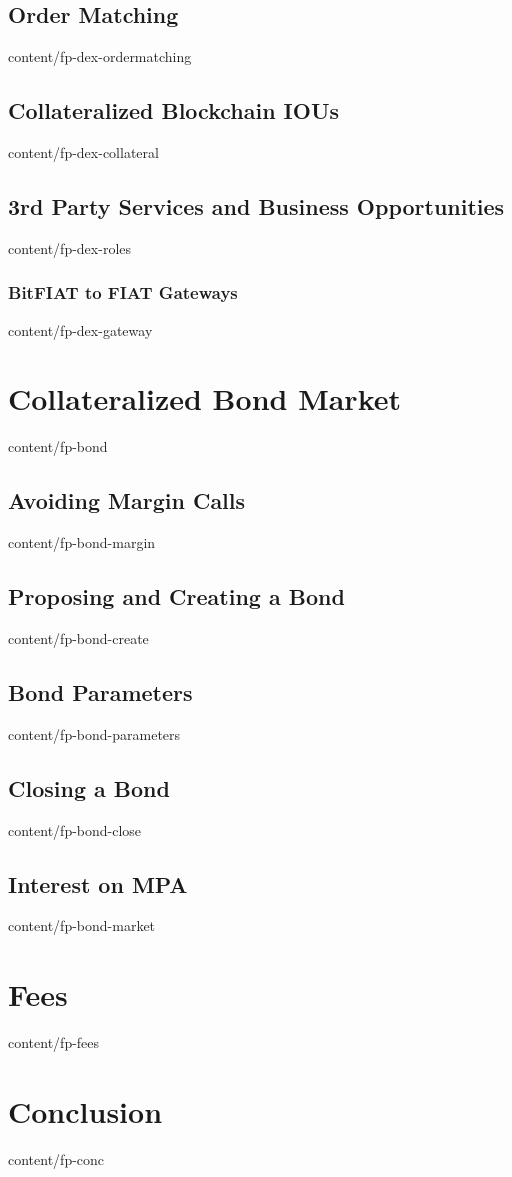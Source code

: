 \documentclass[conference,final,10pt,a4paper]{IEEEtran}
\begin{document}
\subsection    { Order Matching                                  }  { content/fp-dex-ordermatching   } 
\subsection    { Collateralized Blockchain IOUs                  }  { content/fp-dex-collateral      } 
\subsection    { 3rd Party Services and Business Opportunities   }  { content/fp-dex-roles           } 
\subsubsection { BitFIAT to FIAT Gateways                        }  { content/fp-dex-gateway         } 

\section       { Collateralized Bond Market                      }  { content/fp-bond                } 
\subsection    { Avoiding Margin Calls                           }  { content/fp-bond-margin         } 
\subsection    { Proposing and Creating a Bond                   }  { content/fp-bond-create         } 
\subsection    { Bond Parameters                                 }  { content/fp-bond-parameters     } 
\subsection    { Closing a Bond                                  }  { content/fp-bond-close          } 
\subsection    { Interest on MPA                                 }  { content/fp-bond-market         } 

\section       { Fees                                            }  { content/fp-fees                }

\section       { Conclusion                                      }  { content/fp-conc                } 


\end{document}
